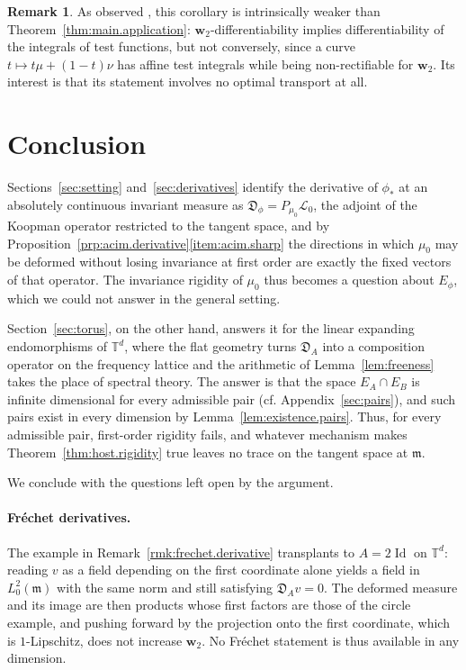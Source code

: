 \documentclass[11pt,reqno]{amsart}
\theoremstyle{plain}
\theoremstyle{definition}
\newtheorem{rmk}[thm]{Remark}
\newcommand{\dw}{\mathbf{w}_2}
\newcommand{\T}{\mathbb{T}}
\newcommand{\Leb}{\mathfrak{m}}
\newcommand{\D}{\mathfrak{D}}
\newcommand{\Transf}{\mathcal{L}}
\DeclareMathOperator{\Id}{Id}
\begin{document}
\begin{rmk}\label{rmk:weaker}
    As observed \cite[Remark 1.9(2)]{kloeckner_optimal_2013_preprint}, this corollary is intrinsically weaker than Theorem~\ref{thm:main.application}: \( \dw \)-differentiability implies differentiability of the integrals of test functions, but not conversely, since a curve \( t\mapsto t\mu+(1-t)\nu \) has affine test integrals while being non-rectifiable for \( \dw \).
    Its interest is that its statement involves no optimal transport at all.
\end{rmk}



\section{Conclusion}
    \label{sec:conclusion}
Sections~\ref{sec:setting} and~\ref{sec:derivatives} identify the derivative of \( \phi_\ast \) at an absolutely continuous invariant measure as \( \D_\phi=P_{\mu_0}\Transf_0 \), the adjoint of the Koopman operator restricted to the tangent space, and by Proposition~\ref{prp:acim.derivative}\ref{item:acim.sharp} the directions in which \( \mu_0 \) may be deformed without losing invariance at first order are exactly the fixed vectors of that operator.
The invariance rigidity of \( \mu_0 \) thus becomes a question about \( E_\phi \), which we could not answer in the general setting.

Section~\ref{sec:torus}, on the other hand, answers it for the linear expanding endomorphisms of \( \T^d \), where the flat geometry turns \( \D_A \) into a composition operator on the frequency lattice and the arithmetic of Lemma~\ref{lem:freeness} takes the place of spectral theory.
The answer is that the space \( E_A\cap E_B \) is infinite dimensional for every admissible pair (cf. Appendix~\ref{sec:pairs}), and such pairs exist in every dimension by Lemma~\ref{lem:existence.pairs}.
Thus, for every admissible pair, first-order rigidity fails, and whatever mechanism makes Theorem~\ref{thm:host.rigidity} true leaves no trace on the tangent space at \(\Leb\).

We conclude with the questions left open by the argument.

\medskip
\paragraph*{\textbf{Fr\'echet derivatives}.}
The example in Remark~\ref{rmk:frechet.derivative} transplants to \( A=2\Id \) on \( \T^d \): reading \( v \) as a field depending on the first coordinate alone yields a field in \( L^2_0(\Leb) \) with the same norm and still satisfying \( \D_Av=0 \).
The deformed measure and its image are then products whose first factors are those of the circle example, and pushing forward by the projection onto the first coordinate, which is \( 1 \)-Lipschitz, does not increase \( \dw \).
No Fr\'echet statement is thus available in any dimension.
\end{document}
